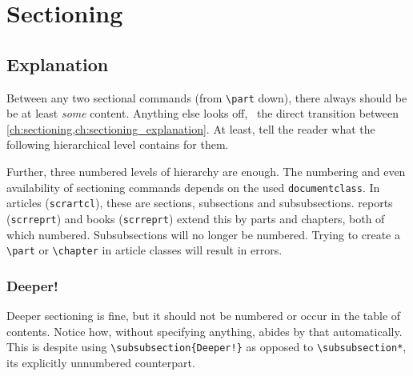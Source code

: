\section{Sectioning}
\label{ch:sectioning}


\subsection{Explanation}
\label{ch:sectioning_explanation}

Between any two sectional commands (from \verb|\part| down), there always should be
be at least \emph{some} content.
Anything else looks off, \ the direct transition between
\cref{ch:sectioning,ch:sectioning_explanation}.
At least, tell the reader what the following hierarchical level contains for them.

Further, three numbered levels of hierarchy are enough.
The numbering and even availability of sectioning commands depends on the used
\verb|documentclass|.
In  articles (\verb|scrartcl|), these are sections,
subsections and subsubsections.
 reports (\verb|scrreprt|) and books (\verb|scrreprt|)
extend this by parts and chapters, both of which numbered.
Subsubsections will no longer be numbered.
Trying to create a \verb|\part| or \verb|\chapter| in article classes will result
in errors.

\subsubsection{Deeper!}

Deeper sectioning is fine, but it should not be numbered or occur in the table of
contents.
Notice how, without specifying anything,  abides by that
automatically.
This is despite using \verb|\subsubsection{Deeper!}| as opposed to \verb|\subsubsection*|,
its explicitly unnumbered counterpart.


